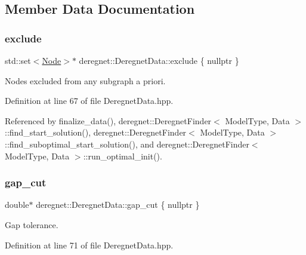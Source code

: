 \subsection{Member Data Documentation}
\mbox{\label{classderegnet_1_1DeregnetData_a8e4398e6ece11ef87767914c6f2c304d}} 
\subsubsection{\texorpdfstring{exclude}{exclude}}
{\footnotesize\ttfamily std\+::set$<$\hyperlink{namespacederegnet_a744bad34f2de9856d36715a445f027f3}{Node}$>$$\ast$ deregnet\+::\+Deregnet\+Data\+::exclude \{ nullptr \}}



Nodes excluded from any subgraph a priori. 



Definition at line 67 of file Deregnet\+Data.\+hpp.



Referenced by finalize\+\_\+data(), deregnet\+::\+Deregnet\+Finder$<$ Model\+Type, Data $>$\+::find\+\_\+start\+\_\+solution(), deregnet\+::\+Deregnet\+Finder$<$ Model\+Type, Data $>$\+::find\+\_\+suboptimal\+\_\+start\+\_\+solution(), and deregnet\+::\+Deregnet\+Finder$<$ Model\+Type, Data $>$\+::run\+\_\+optimal\+\_\+init().

\mbox{\label{classderegnet_1_1DeregnetData_a3637c87366454adc152487fc2f5cfede}} 
\subsubsection{\texorpdfstring{gap\+\_\+cut}{gap\_cut}}
{\footnotesize\ttfamily double$\ast$ deregnet\+::\+Deregnet\+Data\+::gap\+\_\+cut \{ nullptr \}}



Gap tolerance. 



Definition at line 71 of file Deregnet\+Data.\+hpp.



